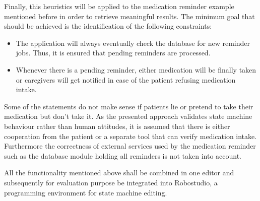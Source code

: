 Finally, this heuristics will be applied to the medication reminder example mentioned before in order to retrieve meaningful results. The minimum goal that should be achieved is the identification of the following constraints:

\begin{itemize}
	\item The application will always eventually check the database for new reminder jobs. Thus, it is ensured that pending reminders are processed.
	\item Whenever there is a pending reminder, either medication will be finally taken or caregivers will get notified in case of the patient refusing medication intake.
\end{itemize}

Some of the statements do not make sense if patients lie or pretend to take their medication but don't take it. As the presented approach validates state machine behaviour rather than human attitudes, it is assumed that there is either cooperation from the patient or a separate tool that can verify medication intake. Furthermore the correctness of external services used by the medication reminder such as the database module holding all reminders is not taken into account.

All the functionality mentioned above shall be combined in one editor and subsequently for evaluation purpose be integrated into Robostudio, a programming environment for state machine editing.